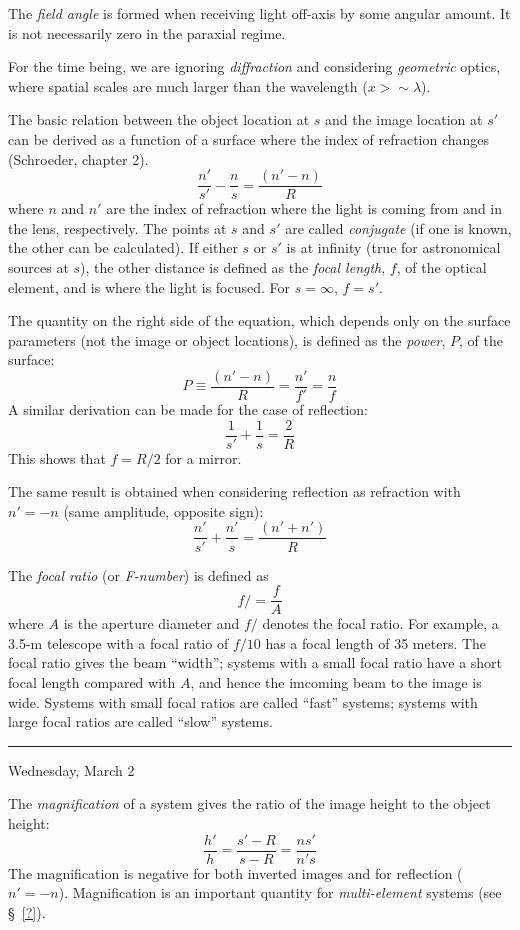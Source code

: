 \documentclass[12pt]{article}
\begin{document}
The \emph{field angle} is formed when receiving light
off-axis by some angular amount.
It is not necessarily zero in the paraxial regime.

For the time being, we are ignoring \emph{diffraction}
and considering \emph{geometric} optics, where spatial scales are
much larger than the wavelength ($x > \sim\lambda$).

The basic relation between the object location at $s$ and
the image location at $s'$ can be derived as a function of a
surface where the index of
refraction changes (Schroeder, chapter 2).
$$  \frac{n'}{s'}-\frac{n}{s} = \frac{(n'-n)}{R}  $$
where $n$ and $n'$ are the index of refraction where the light is coming from
and in the lens, respectively.
The points at $s$ and $s'$ are called \emph{conjugate} (if one is known,
the other can be calculated). If either $s$
or $s'$ is at infinity (true for astronomical sources at $s$), the
other distance is defined as the \emph{focal length}, $f$, of the
optical element, and is where the light is focused.
For $s=\infty$, $f=s'$.

The quantity on the right side of the equation, which
depends only on the surface parameters (not the image or object
locations), is defined as the \emph{power}, $P$, of the surface:
    $$ P \equiv \frac{(n'-n)}{R} = \frac{n'}{f'} = \frac{n}{f} $$
A similar derivation can be made for the case of reflection:
    $$ \frac{1}{s'} + \frac{1}{s} = \frac{2}{R}  $$
This shows that $f = R/2$ for a mirror.

The same result is obtained when considering reflection as
refraction with
$n' = -n$ (same amplitude, opposite sign):
$$  \frac{n'}{s'}+\frac{n'}{s} = \frac{(n'+n')}{R}  $$

The \emph{focal ratio} (or \emph{F-number}) is defined as
$$ f/ = \frac{f}{A}$$
where $A$ is the aperture diameter and $f/$ denotes the focal ratio.
For example, a 3.5-m telescope with a focal ratio of $f /10$
has a focal length of 35 meters.
The focal ratio gives the beam ``width''; systems with a small focal ratio
have a short focal length compared with $A$, and hence the imcoming
beam to the image is wide. Systems with small focal ratios are called
``fast'' systems; systems with large focal ratios are called ``slow'' systems.

\rule{\textwidth}{0.4pt}

{\small\hfill\textcolor{date}{Wednesday, March 2}}

The \emph{magnification} of a system gives the ratio of the image height to
the object height:{$$
    \frac{h'}{h} = \frac{s'-R}{s-R} = \frac{ns'}{n's}
$$}The magnification is negative for both inverted images and for
reflection ($n' = -n$).
Magnification is an important quantity for \emph{multi-element} systems
(see \S{}~\ref{?}).
\end{document}
